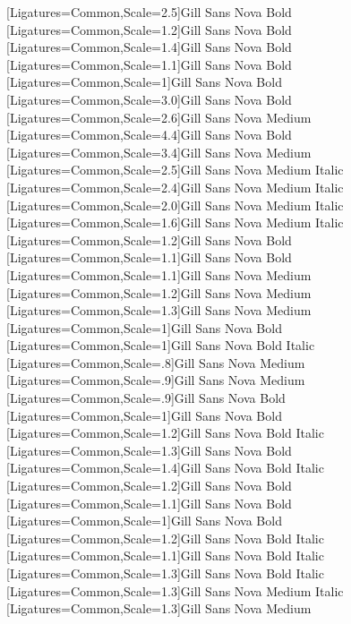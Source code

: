 \setsansfont[Ligatures=Common,Scale=1,SlantedFont={Gill Sans Nova Medium Italic},BoldFont={Gill Sans Nova Bold},BoldSlantedFont={Gill Sans Nova Bold Italic}]{Gill Sans Nova Medium} %
\newfontface{\sfbHugeRomeo}[Ligatures=Common,Scale=2.5]{Gill Sans Nova Bold}
\newfontface{\cmssbxparttocRomeo}[Ligatures=Common,Scale=1.2]{Gill Sans Nova Bold}
\newfontface{\cmssbxsectionRomeo}[Ligatures=Common,Scale=1.4]{Gill Sans Nova Bold}
\newfontface{\cmssbxelevenRomeo}[Ligatures=Common,Scale=1.1]{Gill Sans Nova Bold}
\newfontface{\cmssbxchaptocRomeo}[Ligatures=Common,Scale=1]{Gill Sans Nova Bold}
\newfontface{\cmssbxchaptitleRomeo}[Ligatures=Common,Scale=3.0]{Gill Sans Nova Bold}
\newfontface{\cmsschapnameRomeo}[Ligatures=Common,Scale=2.6]{Gill Sans Nova Medium}
\newfontface{\cmssbxpartRomeo}[Ligatures=Common,Scale=4.4]{Gill Sans Nova Bold}
\newfontface{\cmssparttitleRomeo}[Ligatures=Common,Scale=3.4]{Gill Sans Nova Medium}
\newfontface{\sfiHuge}[Ligatures=Common,Scale=2.5]{Gill Sans Nova Medium Italic}
\newfontface{\sfititleRomeo}[Ligatures=Common,Scale=2.4]{Gill Sans Nova Medium Italic}
\newfontface{\sfihalftitleRomeo}[Ligatures=Common,Scale=2.0]{Gill Sans Nova Medium Italic}
\newfontface{\sfiauthorRomeo}[Ligatures=Common,Scale=1.6]{Gill Sans Nova Medium Italic}
\newfontface{\sfblargeRomeo}[Ligatures=Common,Scale=1.2]{Gill Sans Nova Bold}
\newfontface{\sfbelevenRomeo}[Ligatures=Common,Scale=1.1]{Gill Sans Nova Bold}
\newfontface{\sfelevenRomeo}[Ligatures=Common,Scale=1.1]{Gill Sans Nova Medium}
\newfontface{\sftwelveRomeo}[Ligatures=Common,Scale=1.2]{Gill Sans Nova Medium}
\newfontface{\sfthirteenRomeo}[Ligatures=Common,Scale=1.3]{Gill Sans Nova Medium}
\newfontface{\sfbRomeo}[Ligatures=Common,Scale=1]{Gill Sans Nova Bold}
\newfontface{\sfbiRomeo}[Ligatures=Common,Scale=1]{Gill Sans Nova Bold Italic}
\newfontface{\sfeightRomeo}[Ligatures=Common,Scale=.8]{Gill Sans Nova Medium}
\newfontface{\sfnineRomeo}[Ligatures=Common,Scale=.9]{Gill Sans Nova Medium}
\newfontface{\sfbnineRomeo}[Ligatures=Common,Scale=.9]{Gill Sans Nova Bold}
[Ligatures=Common,Scale=1]{Gill Sans Nova Bold}
\newfontface{\sfbitwelveRomeo}[Ligatures=Common,Scale=1.2]{Gill Sans Nova Bold Italic}
\newfontface{\sfbsectionRomeo}[Ligatures=Common,Scale=1.3]{Gill Sans Nova Bold}
\newfontface{\sfbsectionitalRomeo}[Ligatures=Common,Scale=1.4]{Gill Sans Nova Bold Italic}
\newfontface{\sfbsubsecRomeo}[Ligatures=Common,Scale=1.2]{Gill Sans Nova Bold}
\newfontface{\sfbsubsubRomeo}[Ligatures=Common,Scale=1.1]{Gill Sans Nova Bold}
\newfontface{\sfbparaRomeo}[Ligatures=Common,Scale=1]{Gill Sans Nova Bold}
\newfontface{\sfbsubsecitalRomeo}[Ligatures=Common,Scale=1.2]{Gill Sans Nova Bold Italic}
\newfontface{\sfbsubsubsecitalRomeo}[Ligatures=Common,Scale=1.1]{Gill Sans Nova Bold Italic}
\newfontface{\sfbiRHRomeo}[Ligatures=Common,Scale=1.3]{Gill Sans Nova Bold Italic}
\newfontface{\sfiRHRomeo}[Ligatures=Common,Scale=1.3]{Gill Sans Nova Medium Italic}
\newfontface{\sfRHRomeo}[Ligatures=Common,Scale=1.3]{Gill Sans Nova Medium}


